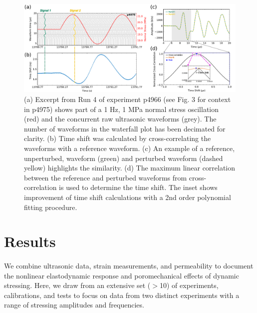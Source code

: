 \documentclass[letterpaper,10pt]{article}
\begin{document}
	\newpage
	
	\begin{figure}[ht]
		\centering
		\includegraphics[width=0.9 \columnwidth]{xcor_fig_v3}
		\caption[]{(a) Excerpt from Run 4 of experiment p4966 (see Fig. 3 for context in p4975) shows part of a 1 Hz, 1 MPa normal stress oscillation (red) and the concurrent raw ultrasonic waveforms (grey). The number of waveforms in the waterfall plot has been decimated for clarity. (b) Time shift was calculated by cross-correlating the waveforms with a reference waveform. (c) An example of a reference, unperturbed, waveform (green) and perturbed waveform (dashed yellow) highlights the similarity. (d) The maximum linear correlation between the reference and perturbed waveforms from cross-correlation is used to determine the time shift. The inset shows improvement of time shift calculations with a 2nd order polynomial fitting procedure.}
		\label{fig:xcor_poly}
	\end{figure}
	
	\newpage
	
	
	
	
	\section{Results}
	\label{results}
	\paragraph{}
	We combine ultrasonic data, strain measurements, and permeability to document the nonlinear elastodynamic response and poromechanical effects of dynamic stressing. Here, we draw from an extensive set ($>$10) of experiments, calibrations, and tests to focus on data from two distinct experiments with a range of stressing amplitudes and frequencies.
	
\end{document}
